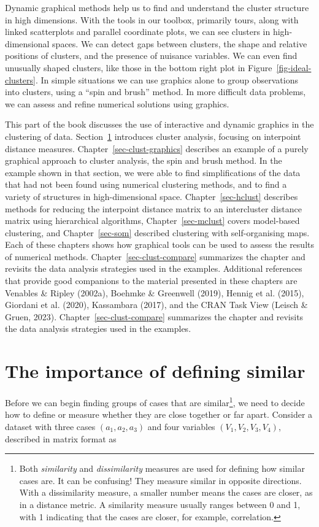 \documentclass[
  letterpaper,
]{book}
\begin{document}
Dynamic graphical methods help us to find and understand the cluster
structure in high dimensions. With the tools in our toolbox, primarily
tours, along with linked scatterplots and parallel coordinate plots, we
can see clusters in high-dimensional spaces. We can detect gaps between
clusters, the shape and relative positions of clusters, and the presence
of nuisance variables. We can even find unusually shaped clusters, like
those in the bottom right plot in Figure~\ref{fig-ideal-clusters}. In
simple situations we can use graphics alone to group observations into
clusters, using a ``spin and brush'' method. In more difficult data
problems, we can assess and refine numerical solutions using
graphics.

This part of the book discusses the use of interactive and dynamic
graphics in the clustering of data. Section~\ref{sec-clust-bg}
introduces cluster analysis, focusing on interpoint distance measures.
Chapter~\ref{sec-clust-graphics} describes an example of a purely
graphical approach to cluster analysis, the spin and brush method. In
the example shown in that section, we were able to find simplifications
of the data that had not been found using numerical clustering methods,
and to find a variety of structures in high-dimensional space.
Chapter~\ref{sec-hclust} describes methods for reducing the interpoint
distance matrix to an intercluster distance matrix using hierarchical
algorithms, Chapter~\ref{sec-mclust} covers model-based clustering, and
Chapter~\ref{sec-som} described clustering with self-organising maps.
Each of these chapters shows how graphical tools can be used to assess
the results of numerical methods. Chapter~\ref{sec-clust-compare}
summarizes the chapter and revisits the data analysis strategies used in
the examples. Additional references that provide good companions to the
material presented in these chapters are Venables \& Ripley (2002a),
Boehmke \& Greenwell (2019), Hennig et al. (2015), Giordani et al.
(2020), Kassambara (2017), and the CRAN Task View (Leisch \& Gruen,
2023). Chapter~\ref{sec-clust-compare} summarizes the chapter and
revisits the data analysis strategies used in the examples.

\hypertarget{sec-clust-bg}{%
\section{The importance of defining similar}\label{sec-clust-bg}}

Before we can begin finding groups of cases that are similar\footnote{Both
  \emph{similarity} and \emph{dissimilarity} measures are used for
  defining how similar cases are. It can be confusing! They measure
  similar in opposite directions. With a dissimilarity measure, a
  smaller number means the cases are closer, as in a distance metric. A
  similarity measure usually ranges between 0 and 1, with 1 indicating
  that the cases are closer, for example, correlation.}, we need to
decide how to define or measure whether they are close together or far
apart. Consider a dataset with three cases \((a_1, a_2, a_3)\) and four
variables \((V_1, V_2, V_3, V_4)\), described in matrix format as
\end{document}
